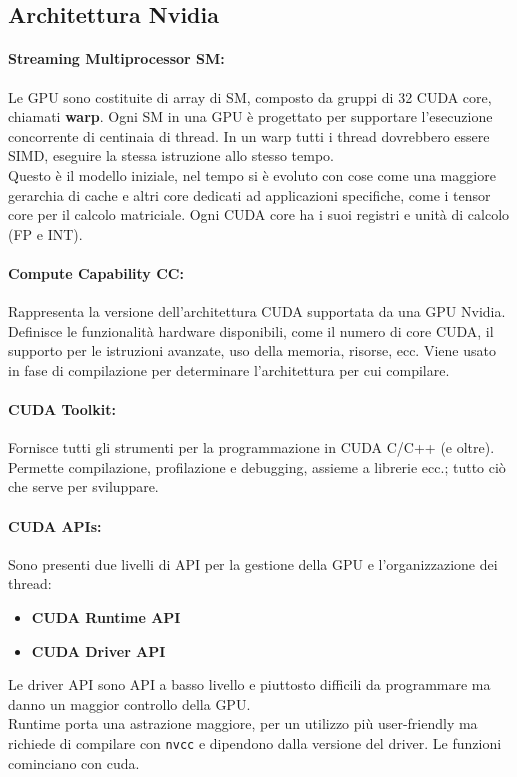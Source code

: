 \subsection{Architettura Nvidia}

\paragraph{Streaming Multiprocessor SM:} Le GPU sono costituite di array di SM, composto da gruppi di 32 CUDA core, chiamati \textbf{warp}. Ogni SM in una GPU è progettato per supportare l’esecuzione concorrente di centinaia di thread. In un warp tutti i thread dovrebbero essere SIMD, eseguire la stessa istruzione allo stesso tempo.\\
Questo è il modello iniziale, nel tempo si è evoluto con cose come una maggiore gerarchia di cache e altri core dedicati ad applicazioni specifiche, come i tensor core per il calcolo matriciale. Ogni CUDA core ha i suoi registri e unità di calcolo (FP e INT).\\

\paragraph{Compute Capability CC:} Rappresenta la versione dell'architettura CUDA supportata da una GPU Nvidia. Definisce le funzionalità hardware disponibili, come il numero di core CUDA, il supporto per le istruzioni avanzate, uso della memoria, risorse, ecc. Viene usato in fase di compilazione per determinare l'architettura per cui compilare.\\

\paragraph{CUDA Toolkit:} Fornisce tutti gli strumenti per la programmazione in CUDA C/C++ (e oltre). Permette compilazione, profilazione e debugging, assieme a librerie ecc.; tutto ciò che serve per sviluppare.\\

\paragraph{CUDA APIs:} Sono presenti due livelli di API per la gestione della GPU e l'organizzazione dei thread:
\begin{itemize}
	\item \textbf{CUDA Runtime API}
	\item \textbf{CUDA Driver API}
\end{itemize}
Le driver API sono API a basso livello e piuttosto difficili da programmare ma danno un maggior controllo della GPU.\\
Runtime porta una astrazione maggiore, per un utilizzo più user-friendly ma richiede di compilare con \texttt{nvcc} e dipendono dalla versione del driver. Le funzioni cominciano con cuda.\\
